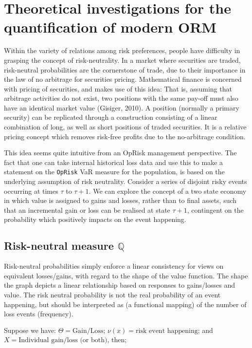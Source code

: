 \documentclass[]{DissertateUSU}
\begin{document}
\section{Theoretical investigations for the quantification of modern ORM}

Within the variety of relations among risk preferences, people have
difficulty in grasping the concept of risk-neutrality. In a market where
securities are traded, risk-neutral probabilities are the cornerstone of
trade, due to their importance in the law of no arbitrage for securities
pricing. Mathematical finance is concerned with pricing of securities,
and makes use of this idea: That is, assuming that arbitrage activities
do not exist, two positions with the same pay-off must also have an
identical market value (Gisiger, 2010). A position (normally a primary
security) can be replicated through a construction consisting of a
linear combination of long, as well as short positions of traded
securities. It is a relative pricing concept which removes risk-free
profits due to the no-arbitrage condition.\medskip

This idea seems quite intuitive from an OpRisk management perspective.
The fact that one can take internal historical loss data and use this to
make a statement on the \texttt{OpRisk} VaR measure for the population,
is based on the underlying assumption of risk neutrality. Consider a
series of disjoint risky events occurring at times \(\tau\) to
\(\tau + 1\). We can explore the concept of a two state economy in which
value is assigned to gains and losses, rather than to final assets, such
that an incremental gain or loss can be realised at state \(\tau + 1\),
contingent on the probability which positively impacts on the event
happening. \medskip

\subsection{Risk-neutral measure $\mathbb{Q}$}

Risk-neutral probabilities simply enforce a linear consistency for views
on equivalent losses/gains, with regard to the shape of the value
function. The shape the graph depicts a linear relationship based on
responses to gains/losses and value. The risk neutral probability is not
the real probability of an event happening, but should be interpreted as
(a functional mapping) of the number of loss events (frequency).\medskip

Suppose we have: \(\Theta = \mbox{Gain/Loss}\);
\(\nu(x) = \mbox{risk event happening}\); and
\(X = \mbox{Individual gain/loss (or both)}\), then; \singlespacing
\end{document}
